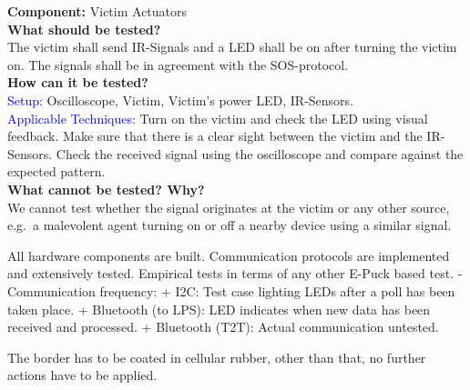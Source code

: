 \documentclass[a4paper,parskip,headheight=38pt]{scrartcl} %
\newcommand{\teststrat}[5]{
	\textbf{Component:} #1 \\
	\noindent\textbf{What should be tested?} \\
    \noindent #2 \\
	\noindent\textbf{How can it be tested?} \\
    \noindent\textcolor{blue}{Setup:} #3 \\
    \noindent\textcolor{blue}{Applicable Techniques:} #4 \\
	\noindent\textbf{What cannot be tested? Why?} \\
    \noindent #5
}
\begin{document}
\teststrat{Victim Actuators}{
    The victim shall send IR-Signals and a LED shall be on after turning the
    victim on. The signals shall be in agreement with the SOS-protocol.
}{
    Oscilloscope, Victim, Victim's power LED, IR-Sensors.
}{
    Turn on the victim and check the LED using visual feedback. Make sure that
    there is a clear sight between the victim and the IR-Sensors. Check the
    received signal using the oscilloscope and compare against the expected
    pattern.
}{
    We cannot test whether the signal originates at the victim or any other
    source, e.g.\ a malevolent agent turning on or off a nearby device using a
    similar signal.
}


All hardware
components are built. Communication protocols are
implemented and extensively tested. Empirical tests in terms of any other E-Puck
based test. - Communication frequency:    + I2C: Test case lighting LEDs after a
poll has been taken place.   + Bluetooth (to LPS): LED indicates when new data
has been received and processed.   + Bluetooth (T2T): Actual communication
untested.

The border has to be coated in cellular rubber, other than that, no further actions have to be applied.
\end{document}
